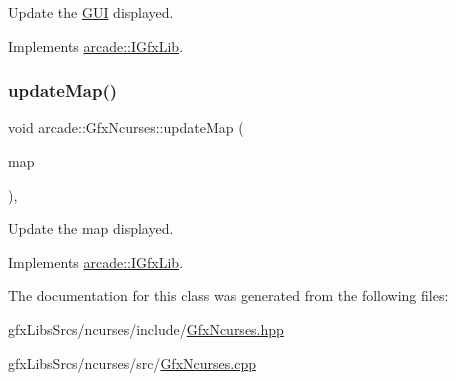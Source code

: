 Update the \hyperlink{classarcade_1_1_g_u_i}{G\+UI} displayed. 



Implements \hyperlink{classarcade_1_1_i_gfx_lib_ae3f443cc341512433815e8bf2dee3e0d}{arcade\+::\+I\+Gfx\+Lib}.

\mbox{\label{classarcade_1_1_gfx_ncurses_a4e02400d983845ebe37f374f3dd82793}} 
\subsubsection{\texorpdfstring{update\+Map()}{updateMap()}}
{\footnotesize\ttfamily void arcade\+::\+Gfx\+Ncurses\+::update\+Map (\begin{DoxyParamCaption}\item[{\hyperlink{classarcade_1_1_i_map}{I\+Map} const \&}]{map }\end{DoxyParamCaption})\hspace{0.3cm}{\ttfamily [override]}, {\ttfamily [virtual]}}



Update the map displayed. 



Implements \hyperlink{classarcade_1_1_i_gfx_lib_addc883f69b75e6ec4927027aad94f5b5}{arcade\+::\+I\+Gfx\+Lib}.



The documentation for this class was generated from the following files\+:\begin{DoxyCompactItemize}
\item 
gfx\+Libs\+Srcs/ncurses/include/\hyperlink{_gfx_ncurses_8hpp}{Gfx\+Ncurses.\+hpp}\item 
gfx\+Libs\+Srcs/ncurses/src/\hyperlink{_gfx_ncurses_8cpp}{Gfx\+Ncurses.\+cpp}\end{DoxyCompactItemize}
